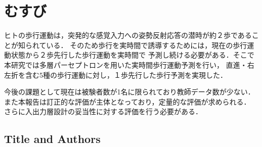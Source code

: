 \documentclass{sigchi}
\begin{document}
%
%
%
%




\balance

\section{むすび}%
ヒトの歩行運動は，突発的な感覚入力への姿勢反射応答の潜時が約２歩であることが知られている．
そのため歩行を実時間で誘導するためには，現在の歩行運動状態から２歩先行した歩行運動を実時間で
予測し続ける必要がある．そこで本研究では多層パーセプトロンを用いた実時間歩行運動予測を行い，
直進・右左折を含む5種の歩行運動に対し，１歩先行した歩行予測を実現した．

今後の課題として現在は被験者数が1名に限られており教師データ数が少ない．
また本報告は訂正的な評価が主体となっており，定量的な評価が求められる．
さらに入出力層設計の妥当性に対する評価を行う必要がある．


\subsection{Title and Authors}
\end{document}
